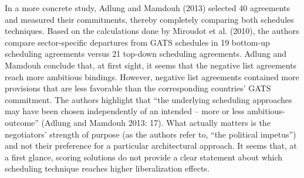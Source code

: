 \documentclass{article}
\begin{document}
\smallskip

In a more concrete study, Adlung and Mamdouh (2013) selected 40 agreements and measured their commitments, thereby completely comparing both schedules techniques. Based on the calculations done by Miroudot et al. (2010), the authors compare sector-specific departures from GATS schedules in 19 bottom-up scheduling agreements versus 21 top-down scheduling agreements. Adlung and Mamdouh conclude that, at first sight, it seems that the negative list agreements reach more ambitious bindings. However, negative list agreements contained more provisions that are less favorable than the corresponding countries’ GATS commitment. The authors highlight that “the underlying scheduling approaches may have been chosen independently of an intended – more or less ambitious- outcome” (Adlung and Mamdouh 2013: 17). What actually matters is the negotiators’ strength of purpose (as the authors refer to, “the political impetus”) and not their preference for a particular architectural approach. It seems that, at a first glance, scoring solutions do not provide a clear statement about which scheduling technique reaches higher liberalization effects.

\smallskip
\end{document}
